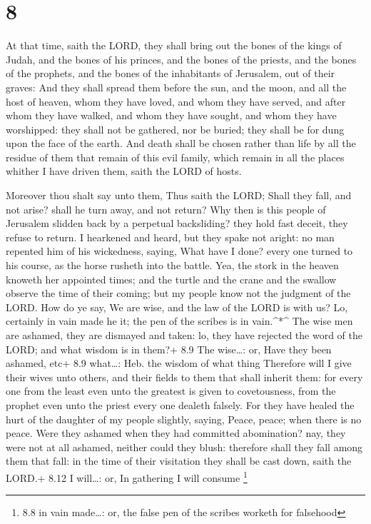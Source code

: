 \hypertarget{section-7}{%
\section{8}\label{section-7}}

 At that time, saith the LORD, they shall bring out the
bones of the kings of Judah, and the bones of his princes, and the bones
of the priests, and the bones of the prophets, and the bones of the
inhabitants of Jerusalem, out of their graves:  And they
shall spread them before the sun, and the moon, and all the host of
heaven, whom they have loved, and whom they have served, and after whom
they have walked, and whom they have sought, and whom they have
worshipped: they shall not be gathered, nor be buried; they shall be for
dung upon the face of the earth.  And death shall be chosen
rather than life by all the residue of them that remain of this evil
family, which remain in all the places whither I have driven them, saith
the LORD of hosts.

 Moreover thou shalt say unto them, Thus saith the LORD;
Shall they fall, and not arise? shall he turn away, and not return?
 Why then is this people of Jerusalem slidden back by a
perpetual backsliding? they hold fast deceit, they refuse to return.
 I hearkened and heard, but they spake not aright: no man
repented him of his wickedness, saying, What have I done? every one
turned to his course, as the horse rusheth into the battle. 
Yea, the stork in the heaven knoweth her appointed times; and the turtle
and the crane and the swallow observe the time of their coming; but my
people know not the judgment of the LORD.  How do ye say, We
are wise, and the law of the LORD is with us? Lo, certainly in vain made
he it; the pen of the scribes is in vain.\^{}*\^{}  The wise
men are ashamed, they are dismayed and taken: lo, they have rejected the
word of the LORD; and what wisdom is in them?+ 8.9 The wise\ldots: or,
Have they been ashamed, etc+ 8.9 what\ldots: Heb. the wisdom of what
thing  Therefore will I give their wives unto others, and
their fields to them that shall inherit them: for every one from the
least even unto the greatest is given to covetousness, from the prophet
even unto the priest every one dealeth falsely.  For they
have healed the hurt of the daughter of my people slightly, saying,
Peace, peace; when there is no peace.  Were they ashamed
when they had committed abomination? nay, they were not at all ashamed,
neither could they blush: therefore shall they fall among them that
fall: in the time of their visitation they shall be cast down, saith the
LORD.+ 8.12 I will\ldots: or, In gathering I will consume \footnote{8.8
  in vain made\ldots: or, the false pen of the scribes worketh for
  falsehood}

